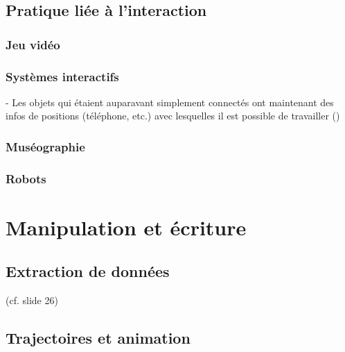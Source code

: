 \documentclass[french,12pt]{article}
\begin{document}
\subsection{Pratique liée à l'interaction}

\subsubsection{Jeu vidéo}
\cite{le_prado_ecriture_2013}
\cite{salazar_modelisation_2004}

\subsubsection{Systèmes interactifs}

- Les objets qui étaient auparavant simplement connectés ont maintenant des infos de positions (téléphone, etc.) avec lesquelles il est possible de travailler (\cite{beal_spacetime_2015})

\cite{chalon_realite_2004}
\cite{jankowski_advances_2015}
\cite{shen_blowbrush:_2014}
\cite{gustafson_imaginary_2010}
\subsubsection{Muséographie}
\cite{adhitya_composing_2012}
\cite{michael_comparative_2010}
\cite{azough_modeet_2014}
\cite{kidd_multi-touch_2011}
\subsubsection{Robots}
\cite{lee_virtual_2014} %

\section{Manipulation et écriture}

\subsection{Extraction de données}
\cite{li_aesthetic_2009} (cf. slide 26)
\subsection{Trajectoires et animation}
\cite{santosa_direct_2013}
\cite{kazi_kitty:_2014,scott_physink:_2013}

\cite{garcia_jeremie_processing_2015,garcia_towards_2015}
\cite{wakefield_cosm:_2011}
\cite{wagner_introducing_2014}
\cite{melchior_authoring_2005} 
\cite{bresson_spatial_2012}
\cite{wozniewski_spatosc:_2012}
\cite{favory_trajectoires:_2015}
\cite{casas_4d_2013}
\end{document}
